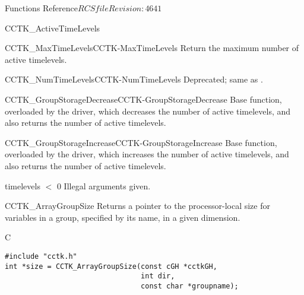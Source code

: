 \begin{cactuspart}{ Functions Reference}{$RCSfile$}{$Revision: 4641 $}
\begin{FunctionDescription}{CCTK\_ActiveTimeLevels}
\begin{SeeAlsoSection}
\begin{SeeAlso2}{CCTK\_MaxTimeLevels}{CCTK-MaxTimeLevels}
Return the maximum number of active timelevels.
\end{SeeAlso2}
\begin{SeeAlso2}{CCTK\_NumTimeLevels}{CCTK-NumTimeLevels}
Deprecated; same as .
\end{SeeAlso2}
\begin{SeeAlso2}{CCTK\_GroupStorageDecrease}{CCTK-GroupStorageDecrease}
Base function, overloaded by the driver, which decreases the number of
active timelevels, and also returns the number of active timelevels.
\end{SeeAlso2}
\begin{SeeAlso2}{CCTK\_GroupStorageIncrease}{CCTK-GroupStorageIncrease}
Base function, overloaded by the driver, which increases the number of
active timelevels, and also returns the number of active timelevels.
\end{SeeAlso2}
\end{SeeAlsoSection}

\begin{ErrorSection}
\begin{Error}{timelevels $<$ 0}
Illegal arguments given.
\end{Error}
\end{ErrorSection}

\end{FunctionDescription}



\begin{FunctionDescription}{CCTK\_ArrayGroupSize}{}
\label{CCTK-ArrayGroupSize}
Returns a pointer to the processor-local size for variables in a
group, specified by its name, in a given dimension.
\begin{SynopsisSection}
\begin{Synopsis}{C}
\begin{verbatim}
#include "cctk.h"
int *size = CCTK_ArrayGroupSize(const cGH *cctkGH,
                                int dir,
                                const char *groupname);
\end{verbatim}
\end{Synopsis}
\end{SynopsisSection}


\end{FunctionDescription}
\end{cactuspart}
